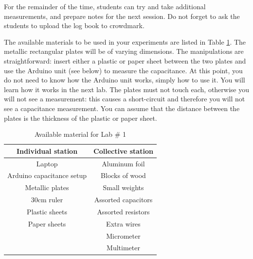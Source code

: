 \documentclass[12pt]{report}
\begin{document}
\begin{tcolorbox}
For the remainder of the time, students can try and take additional measurements, and prepare notes for the next session. Do not forget to ask the students to upload the log book to crowdmark.
\end{tcolorbox}

The available materials to be used in your experiments are listed in Table \ref{Tab:Lab1-material}. The metallic rectangular plates will be of varying dimensions. The manipulations are straightforward: insert either a plastic or paper sheet between the two plates and use the Arduino unit (see below) to measure the capacitance. At this point, you do not need to know how the Arduino unit works, simply how to use it. You will learn how it works in the next lab. The plates must not touch each, otherwise you will not see a measurement: this causes a short-circuit and therefore you will not see a capacitance measurement. You can assume that the distance between the plates is the thickness of the plastic or paper sheet.
\begin{table}[h]
\centering
\begin{tabular}{||c | c ||}
\hline
Individual station & Collective station\\ \hline
Laptop & Aluminum foil \\
Arduino capacitance setup & Blocks of wood \\
Metallic plates & Small weights \\
30cm ruler & Assorted capacitors \\
Plastic sheets & Assorted resistors \\
Paper sheets & Extra wires \\
& Micrometer \\
& Multimeter \\
\hline
\end{tabular}
\caption{Available material for Lab \# 1}
\label{Tab:Lab1-material}
\end{table}
\end{document}
